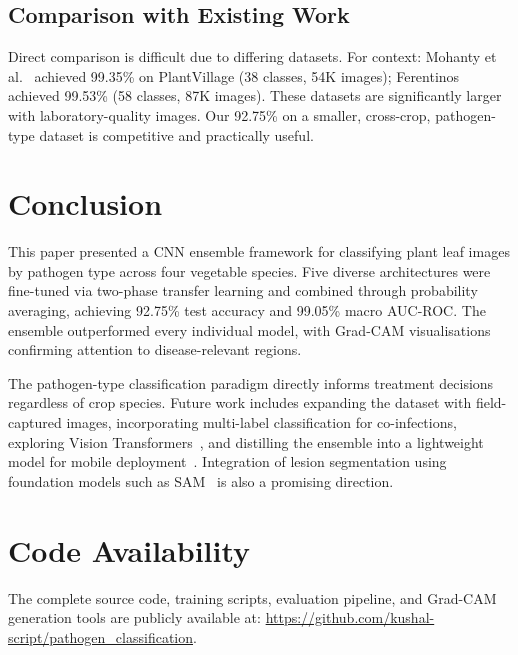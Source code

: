 \documentclass[conference]{IEEEtran}
\begin{document}
\subsection{Comparison with Existing Work}

Direct comparison is difficult due to differing datasets. For context: Mohanty et al.~\cite{mohanty2016using} achieved 99.35\% on PlantVillage (38 classes, 54K images); Ferentinos~\cite{ferentinos2018deep} achieved 99.53\% (58 classes, 87K images). These datasets are significantly larger with laboratory-quality images. Our 92.75\% on a smaller, cross-crop, pathogen-type dataset is competitive and practically useful.

\section{Conclusion}

This paper presented a CNN ensemble framework for classifying plant leaf images by pathogen type across four vegetable species. Five diverse architectures were fine-tuned via two-phase transfer learning and combined through probability averaging, achieving 92.75\% test accuracy and 99.05\% macro AUC-ROC. The ensemble outperformed every individual model, with Grad-CAM visualisations confirming attention to disease-relevant regions.

The pathogen-type classification paradigm directly informs treatment decisions regardless of crop species. Future work includes expanding the dataset with field-captured images, incorporating multi-label classification for co-infections, exploring Vision Transformers~\cite{dosovitskiy2021image}, and distilling the ensemble into a lightweight model for mobile deployment~\cite{hinton2015distilling}. Integration of lesion segmentation using foundation models such as SAM~\cite{kirillov2023segment} is also a promising direction.

\section*{Code Availability}

The complete source code, training scripts, evaluation pipeline, and Grad-CAM generation tools are publicly available at: \url{https://github.com/kushal-script/pathogen_classification}.
\end{document}

